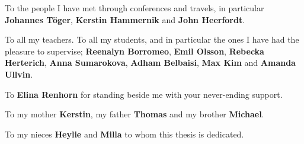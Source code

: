 \documentclass[11pt,twoside,openright]{book}
\begin{document}
To the people I have met through conferences and travels, in particular \textbf{Johannes Töger}, \textbf{Kerstin Hammernik} and \textbf{John Heerfordt}.

To all my teachers. To all my students, and in particular the ones I have had the pleasure to supervise; \textbf{Reenalyn Borromeo}, \textbf{Emil Olsson}, \textbf{Rebecka Herterich}, \textbf{Anna Sumarokova}, \textbf{Adham Belbaisi}, \textbf{Max Kim} and \textbf{Amanda Ullvin}.

To \textbf{Elina Renhorn} for standing beside me with your never-ending support.

To my mother \textbf{Kerstin}, my father \textbf{Thomas} and my brother \textbf{Michael}.

To my nieces \textbf{Heylie} and \textbf{Milla} to whom this thesis is dedicated.
\newpage


\end{document}
